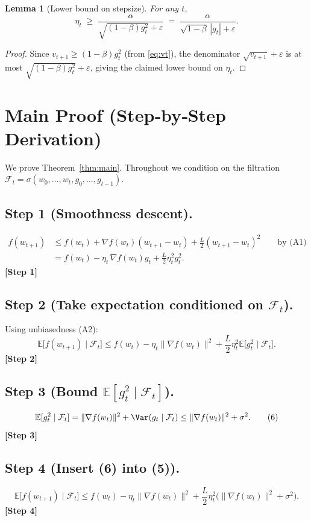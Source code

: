 \documentclass[11pt]{article}
\newtheorem{lemma}{Lemma}
\newcommand{\E}{\mathbb{E}}
\begin{document}
\begin{lemma}[Lower bound on stepsize]\label{lem:eta}
For any $t$,
\[
\eta_t \;\ge\; \frac{\alpha}{\sqrt{(1-\beta)g_t^{2}}+\varepsilon}
\;=\; \frac{\alpha}{\sqrt{1-\beta}\,|g_t|+\varepsilon}. \tag{3}
\]
\end{lemma}
\begin{proof}
Since $v_{t+1}\ge (1-\beta)g_t^{2}$ (from \eqref{eq:vt}), the denominator $\sqrt{v_{t+1}}+\varepsilon$ is at most $\sqrt{(1-\beta)g_t^{2}}+\varepsilon$, giving the claimed lower bound on $\eta_t$. \qedhere
\end{proof}

\section*{Main Proof (Step‑by‑Step Derivation)}
We prove Theorem~\ref{thm:main}.  Throughout we condition on the filtration $\mathcal{F}_t=\sigma(w_0,\dots,w_t,g_0,\dots,g_{t-1})$.

\subsection*{Step 1 (Smoothness descent).}
\[
\begin{aligned}
f(w_{t+1})
&\le f(w_t)+\nabla f(w_t)(w_{t+1}-w_t)+\frac{L}{2}(w_{t+1}-w_t)^2 \qquad\text{by (A1)}\\
&= f(w_t)-\eta_t\,\nabla f(w_t)g_t+\frac{L}{2}\eta_t^{2}g_t^{2}. \tag{4}
\end{aligned}
\]
\noindent\textbf{[Step 1]}

\subsection*{Step 2 (Take expectation conditioned on $\mathcal{F}_t$).}
Using unbiasedness (A2):
\[
\E\big[f(w_{t+1})\mid\mathcal{F}_t\big]
\le f(w_t)-\eta_t\|\nabla f(w_t)\|^{2}
+\frac{L}{2}\eta_t^{2}\E\big[g_t^{2}\mid\mathcal{F}_t\big]. \tag{5}
\]
\noindent\textbf{[Step 2]}

\subsection*{Step 3 (Bound $\E[g_t^{2}\mid\mathcal{F}_t]$).}
\[
\E[g_t^{2}\mid\mathcal{F}_t]
= \|\nabla f(w_t)\|^{2}+\Var(g_t\mid\mathcal{F}_t)
\le \|\nabla f(w_t)\|^{2}+\sigma^{2}. \tag{6}
\]
\noindent\textbf{[Step 3]}

\subsection*{Step 4 (Insert (6) into (5)).}
\[
\E\big[f(w_{t+1})\mid\mathcal{F}_t\big]
\le f(w_t)-\eta_t\|\nabla f(w_t)\|^{2}
+\frac{L}{2}\eta_t^{2}\big(\|\nabla f(w_t)\|^{2}+\sigma^{2}\big). \tag{7}
\]
\noindent\textbf{[Step 4]}
\end{document}
